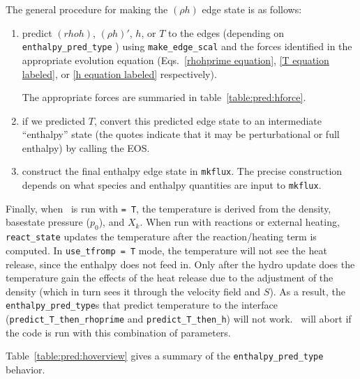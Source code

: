 The general procedure for making the $(\rho h)$ edge state is as follows:
\begin{enumerate}
\item predict $(rho h)$, $(\rho h)'$, $h$, or $T$ to the edges (depending on {\tt
  enthalpy\_pred\_type} ) using {\tt make\_edge\_scal} and the forces
  identified in the appropriate evolution equation
  (Eqs.~\ref{rhohprime equation}, \ref{T equation labeled}, or \ref{h
    equation labeled} respectively).

  The appropriate forces are summaried in table~\ref{table:pred:hforce}.

\item if we predicted $T$, convert this predicted
  edge state to an intermediate ``enthalpy'' state (the quotes
  indicate that it may be perturbational or full enthalpy) by calling
  the EOS.
 
\item construct the final enthalpy edge state in {\tt mkflux}.  The
  precise construction depends on what species and enthalpy quantities
  are input to {\tt mkflux}.

\end{enumerate}

Finally, when \maestro\ is run with  {\tt = T}, the
temperature is derived from the density, basestate pressure ($p_0$),
and $X_k$.  When run with reactions or external heating, {\tt
  react\_state} updates the temperature after the reaction/heating
term is computed.  In {\tt use\_tfromp = T} mode, the temperature will
not see the heat release, since the enthalpy does not feed in.  Only
after the hydro update does the temperature gain the effects of the
heat release due to the adjustment of the density (which in turn sees
it through the velocity field and $S$).  As a result, the {\tt
  enthalpy\_pred\_type}s that predict temperature to the interface
({\tt predict\_T\_then\_rhoprime} and {\tt predict\_T\_then\_h}) will
not work.  \maestro\ will abort if the code is run with this
combination of parameters.

Table~\ref{table:pred:hoverview}
gives a summary
of the {\tt enthalpy\_pred\_type} behavior.


